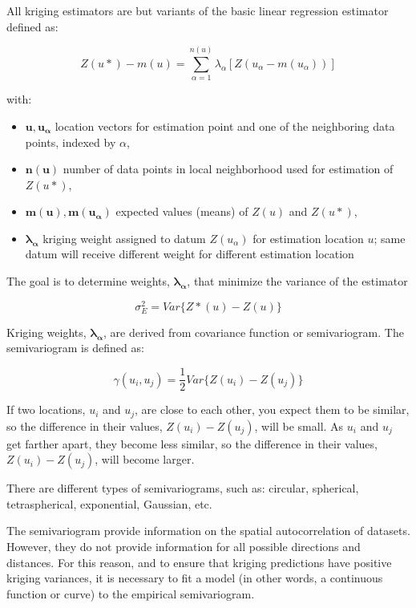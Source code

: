 All kriging estimators are but variants of the basic linear regression estimator defined as:

\begin{equation}
Z(u*) - m(u) = \sum_{\alpha = 1}^{n(u)} \lambda_{\alpha}\left[Z(u_{\alpha} - m(u_{\alpha})) \right] 
\end{equation}

with:

\begin{itemize}
\item $\bm{u}, \bm{u_{\alpha}}$ location vectors for estimation point and one of the neighboring data points, indexed by $\alpha$,
\item $\bm{n(u)}$ number of data points in local neighborhood used for estimation of $Z(u*)$,
\item $\bm{m(u)}, \bm{m(u_{\alpha})}$ expected values (means) of $Z(u)$ and $Z(u*)$,
\item $\bm{\lambda_{\alpha}}$ kriging weight assigned to datum $Z(u_{\alpha})$ for estimation
location $u$; same datum will receive different weight for different estimation location
\end{itemize}

The goal is to determine weights, $\bm{\lambda_{\alpha}}$, that minimize the variance of the estimator

\begin{equation}
\sigma_{E}^2 = Var \lbrace Z*(u)-Z(u) \rbrace
\end{equation}

Kriging weights, $\bm{\lambda_{\alpha}}$, are derived from covariance function or semivariogram. The semivariogram is defined as:

\begin{equation}
\gamma(u_{i}, u_{j}) = \frac{1}{2}Var \lbrace Z(u_{i})-Z(u_{j}) \rbrace
\end{equation}

If two locations, $u_{i}$ and $u_{j}$, are close to each other, you expect them to be similar, so the difference in their values, $Z(u_{i})-Z(u_{j})$, will be small. As $u_{i}$ and $u_{j}$ get farther apart, they become less similar, so the difference in their values, $Z(u_{i})-Z(u_{j})$, will become larger.

There are different types of semivariograms, such as: circular, spherical, tetraspherical, exponential, Gaussian, etc.

The semivariogram provide information on the spatial autocorrelation of datasets. However, they do not provide information for all possible directions and distances. For this reason, and to ensure that kriging predictions have positive kriging variances, it is necessary to fit a model (in other words, a continuous function or curve) to the empirical semivariogram.

